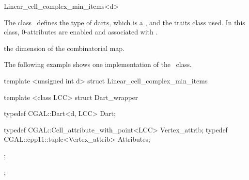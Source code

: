 \ccRefPageBegin

\begin{ccRefClass}{Linear_cell_complex_min_items<d>}


\ccDefinition
  
The class \ccRefName\ defines the type of darts, which is a
, and the traits class used.  In
this class, 0-attributes are enabled and associated with
.

\ccIsModel
{}

\ccParameters
{} the dimension of the combinatorial map.

\ccExample

The following example shows one implementation of the
\ccRefName\ class.

\begin{ccExampleCode}
  template <unsigned int d>
  struct Linear_cell_complex_min_items
  {
    template <class LCC>
    struct Dart_wrapper
    {
      typedef CGAL::Dart<d, LCC> Dart;

      typedef CGAL::Cell_attribute_with_point<LCC> Vertex_attrib;    
      typedef CGAL::cpp11::tuple<Vertex_attrib> Attributes;
    };
  };
\end{ccExampleCode}

\ccSeeAlso
{}\\

\end{ccRefClass}

\ccRefPageEnd

